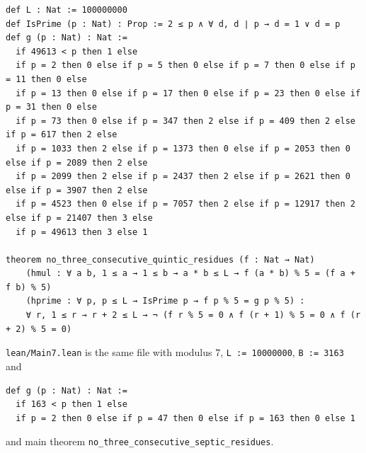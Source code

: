\documentclass[11pt]{article}
\numberwithin{equation}{section}
\theoremstyle{definition}
\theoremstyle{remark}
\begin{document}
\begin{lstlisting}[style=lean]
def L : Nat := 100000000
def IsPrime (p : Nat) : Prop := 2 ≤ p ∧ ∀ d, d ∣ p → d = 1 ∨ d = p
def g (p : Nat) : Nat :=
  if 49613 < p then 1 else
  if p = 2 then 0 else if p = 5 then 0 else if p = 7 then 0 else if p = 11 then 0 else
  if p = 13 then 0 else if p = 17 then 0 else if p = 23 then 0 else if p = 31 then 0 else
  if p = 73 then 0 else if p = 347 then 2 else if p = 409 then 2 else if p = 617 then 2 else
  if p = 1033 then 2 else if p = 1373 then 0 else if p = 2053 then 0 else if p = 2089 then 2 else
  if p = 2099 then 2 else if p = 2437 then 2 else if p = 2621 then 0 else if p = 3907 then 2 else
  if p = 4523 then 0 else if p = 7057 then 2 else if p = 12917 then 2 else if p = 21407 then 3 else
  if p = 49613 then 3 else 1

theorem no_three_consecutive_quintic_residues (f : Nat → Nat)
    (hmul : ∀ a b, 1 ≤ a → 1 ≤ b → a * b ≤ L → f (a * b) % 5 = (f a + f b) % 5)
    (hprime : ∀ p, p ≤ L → IsPrime p → f p % 5 = g p % 5) :
    ∀ r, 1 ≤ r → r + 2 ≤ L → ¬ (f r % 5 = 0 ∧ f (r + 1) % 5 = 0 ∧ f (r + 2) % 5 = 0)
\end{lstlisting}

\texttt{lean/Main7.lean} is the same file with modulus $7$, \texttt{L := 10000000}, \texttt{B := 3163} and
\begin{lstlisting}[style=lean]
def g (p : Nat) : Nat :=
  if 163 < p then 1 else
  if p = 2 then 0 else if p = 47 then 0 else if p = 163 then 0 else 1
\end{lstlisting}
and main theorem \texttt{no\_three\_consecutive\_septic\_residues}.
\end{document}
